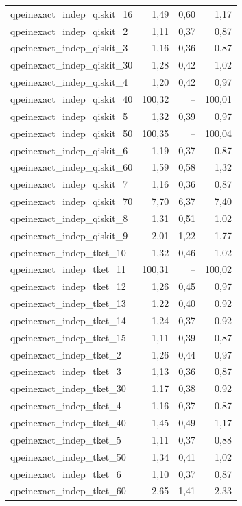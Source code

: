 \begin{longtable}{lrrr}
qpeinexact\_indep\_qiskit\_16 & 1,49 & 0,60 & 1,17 \\
qpeinexact\_indep\_qiskit\_2 & 1,11 & 0,37 & 0,87 \\
qpeinexact\_indep\_qiskit\_3 & 1,16 & 0,36 & 0,87 \\
qpeinexact\_indep\_qiskit\_30 & 1,28 & 0,42 & 1,02 \\
qpeinexact\_indep\_qiskit\_4 & 1,20 & 0,42 & 0,97 \\
qpeinexact\_indep\_qiskit\_40 & 100,32 & -- & 100,01 \\
qpeinexact\_indep\_qiskit\_5 & 1,32 & 0,39 & 0,97 \\
qpeinexact\_indep\_qiskit\_50 & 100,35 & -- & 100,04 \\
qpeinexact\_indep\_qiskit\_6 & 1,19 & 0,37 & 0,87 \\
qpeinexact\_indep\_qiskit\_60 & 1,59 & 0,58 & 1,32 \\
qpeinexact\_indep\_qiskit\_7 & 1,16 & 0,36 & 0,87 \\
qpeinexact\_indep\_qiskit\_70 & 7,70 & 6,37 & 7,40 \\
qpeinexact\_indep\_qiskit\_8 & 1,31 & 0,51 & 1,02 \\
qpeinexact\_indep\_qiskit\_9 & 2,01 & 1,22 & 1,77 \\
qpeinexact\_indep\_tket\_10 & 1,32 & 0,46 & 1,02 \\
qpeinexact\_indep\_tket\_11 & 100,31 & -- & 100,02 \\
qpeinexact\_indep\_tket\_12 & 1,26 & 0,45 & 0,97 \\
qpeinexact\_indep\_tket\_13 & 1,22 & 0,40 & 0,92 \\
qpeinexact\_indep\_tket\_14 & 1,24 & 0,37 & 0,92 \\
qpeinexact\_indep\_tket\_15 & 1,11 & 0,39 & 0,87 \\
qpeinexact\_indep\_tket\_2 & 1,26 & 0,44 & 0,97 \\
qpeinexact\_indep\_tket\_3 & 1,13 & 0,36 & 0,87 \\
qpeinexact\_indep\_tket\_30 & 1,17 & 0,38 & 0,92 \\
qpeinexact\_indep\_tket\_4 & 1,16 & 0,37 & 0,87 \\
qpeinexact\_indep\_tket\_40 & 1,45 & 0,49 & 1,17 \\
qpeinexact\_indep\_tket\_5 & 1,11 & 0,37 & 0,88 \\
qpeinexact\_indep\_tket\_50 & 1,34 & 0,41 & 1,02 \\
qpeinexact\_indep\_tket\_6 & 1,10 & 0,37 & 0,87 \\
qpeinexact\_indep\_tket\_60 & 2,65 & 1,41 & 2,33 \\

\end{longtable}
